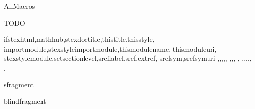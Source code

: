 \documentclass{stex}
\begin{document}
  \begin{smodule}{AllMacros}

  \begin{sfragment}{TODO}

    \begin{sfunction}{
      ifstexhtml,mathhub,stexdoctitle,thistitle,thisstyle,
      importmodule,stexstyleimportmodule,thismodulename,
      thismoduleuri,
      stexstylemodule,setsectionlevel,sreflabel,sref,extref,
      srefsym,srefsymuri
    }{\ifstexhtml,\mathhub,\stexdoctitle,\thistitle,\thisstyle,
    \importmodule,\stexstyleimportmodule,\thismodulename,
    \thismoduleuri,
    \stexstylemodule,\setsectionlevel,\sreflabel,\sref,\extref,
    \srefsym,\srefsymuri
    }
    \end{sfunction}

    \begin{senv}{sfragment}\end{senv}
    \begin{senv}{blindfragment}\end{senv}

  \end{sfragment}
  \end{smodule}
\end{document}
